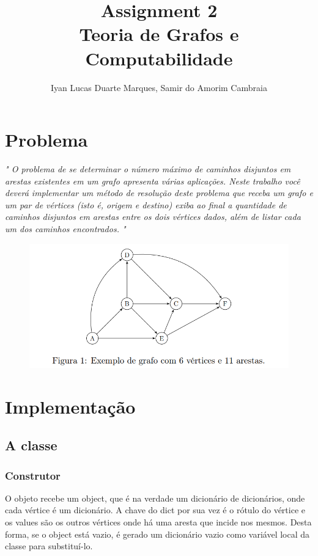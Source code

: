 \documentclass[12pt]{article}
\title{Assignment 2 \\ Teoria de Grafos e Computabilidade}
\author{Iyan Lucas Duarte Marques\inst{1}, Samir do Amorim Cambraia\inst{1}}
\begin{document}
\maketitle

\section{Problema}
\textit{"
	O problema de se determinar o número máximo de caminhos disjuntos em arestas existentes em um grafo
	apresenta várias aplicações. Neste trabalho você deverá implementar um método de resolução deste problema que receba
	um grafo e um par de vértices (isto é, origem e destino) exiba ao final a quantidade de caminhos disjuntos em arestas
	entre os dois vértices dados, além de listar cada um dos caminhos encontrados.
	"}
    \begin{center}
        \begin{figure}[h!]
            \centering
            \includegraphics[width=1\textwidth]{imagens/figura-1.png}
        \end{figure}
    \end{center}

\section{Implementação}
\subsection{A classe}
\subsubsection{Construtor}
O objeto recebe um object, que é na verdade um dicionário de dicionários, onde cada vértice é um dicionário. 
A chave do dict por sua vez é o rótulo do vértice e os values são os outros vértices onde há uma aresta que incide nos mesmos.
Desta forma, se o object está vazio, é gerado um dicionário vazio como variável local da classe para substituí-lo.
\end{document}

